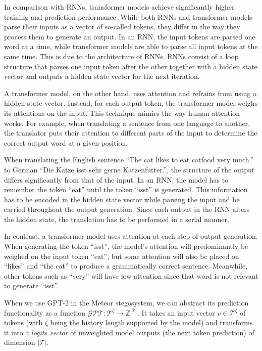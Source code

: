 In comparison with RNNs, transformer models achieve significantly higher training and prediction performance.
While both RNNs and transformer models parse their inputs as a vector of so-called tokens, they differ in the way they process them to generate an output.
In an RNN, the input tokens are parsed one word at a time, while transformer models are able to parse all input tokens at the same time.
This is due to the architecture of RNNs.
RNNs consist of a loop structure that parses one input token after the other together with a hidden state vector and outputs a hidden state vector for the next iteration.

A transformer model, on the other hand, uses attention and refrains from using a hidden state vector.
Instead, for each output token, the transformer model weighs its attentions on the input.
This technique mimics the way human attention works.
For example, when translating a sentence from one language to another, the translator puts their attention to different parts of the input to determine the correct output word at a given position.

\begin{example}
  When translating the English sentence ``The cat likes to eat catfood very much.'' to German ``Die Katze isst sehr gerne Katzenfutter.'', the structure of the output differs significantly from that of the input.
  In an RNN, the model has to remember the token ``eat'' until the token ``isst'' is generated.
  This information has to be encoded in the hidden state vector while parsing the input and be carried throughout the output generation.
  Since each output in the RNN alters the hidden state, the translation has to be performed in a serial manner.
    
  In contrast, a transformer model uses attention at each step of output generation.
  When generating the token ``isst'', the model's attention will predominantly be weighed on the input token ``eat'', but some attention will also be placed on ``likes'' and ``the cat'' to produce a grammatically correct sentence.
  Meanwhile, other tokens such as ``very'' will have low attention since that word is not relevant to generate ``isst''.
\end{example}



When we use GPT-2 in the Meteor stegosystem, we can abstract its prediction functionality as a function $\mathcal{GPT} \colon \mathcal{T}^\zeta \rightarrow \mathbb{Z}^{|\mathcal{T}|}$.
It takes an input vector $v \in \mathcal{T}^\zeta$ of tokens (with $\zeta$ being the history length supported by the model) and transforms it into a \emph{logits vector} of unweighted model outputs (the next token prediction) of dimension $|\mathcal{T}|$.

